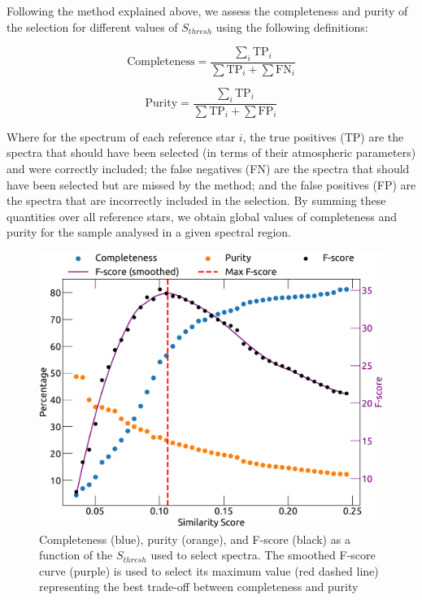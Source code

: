 \documentclass{aa}
\begin{document}
Following the method explained above, we assess the completeness and purity of the selection for different values of $S_{thresh}$ using the following definitions: 

\begin{equation}
    \text{Completeness} = \frac{ \sum_{i} \text{TP}_i}{\sum \text{TP}_i + \sum \text{FN}_i}
    \label{eq:completeness}
\end{equation}

\begin{equation}
    \text{Purity} = \frac{\sum_{i} \text{TP}_i}{\sum \text{TP}_i + \sum \text{FP}_i}
    \label{eq:purity}
\end{equation}

\noindent Where for the spectrum of each reference star $i$, the true positives (TP) are the spectra that should have been selected (in terms of their atmospheric parameters) and were correctly included; the false negatives (FN) are the spectra that should have been selected but are missed by the method; and the false positives (FP) are the spectra that are incorrectly included in the selection. By summing these quantities over all reference stars, we obtain global values of completeness and purity for the sample analysed in a given spectral region.

\begin{figure}[t]
    \centering
    \includegraphics[width=\linewidth]{Plots/completenessWpurity_fscore.pdf}
    \caption{Completeness (blue), purity (orange), and F-score (black) as a function of the $S_{thresh}$ used to select spectra. The smoothed F-score curve (purple) is used to select its maximum value (red dashed line) representing the best trade-off between completeness and purity}
    \label{fig:score.completeness}
\end{figure}
\end{document}
